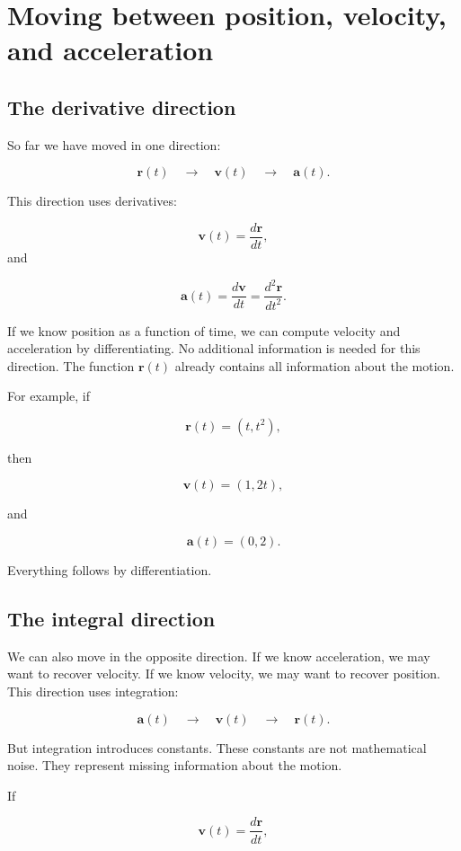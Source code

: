 \section{Moving between position, velocity, and acceleration}

\subsection{The derivative direction}

So far we have moved in one direction:

\[
\mathbf{r}(t)
\quad \longrightarrow \quad
\mathbf{v}(t)
\quad \longrightarrow \quad
\mathbf{a}(t).
\]

This direction uses derivatives:

\[
\mathbf{v}(t)=\frac{d\mathbf{r}}{dt},
\]
and

\[
\mathbf{a}(t)=\frac{d\mathbf{v}}{dt}
=
\frac{d^2\mathbf{r}}{dt^2}.
\]

If we know position as a function of time, we can compute velocity and acceleration by differentiating. No additional information is needed for this direction. The function \(\mathbf{r}(t)\) already contains all information about the motion.

For example, if

\[
\mathbf{r}(t)=(t,t^2),
\]

then

\[
\mathbf{v}(t)=(1,2t),
\]

and

\[
\mathbf{a}(t)=(0,2).
\]

Everything follows by differentiation.

\subsection{The integral direction}

We can also move in the opposite direction. If we know acceleration, we may want to recover velocity. If we know velocity, we may want to recover position. This direction uses integration:

\[
\mathbf{a}(t)
\quad \longrightarrow \quad
\mathbf{v}(t)
\quad \longrightarrow \quad
\mathbf{r}(t).
\]

But integration introduces constants. These constants are not mathematical noise. They represent missing information about the motion.

If

\[
\mathbf{v}(t)=\frac{d\mathbf{r}}{dt},
\]

